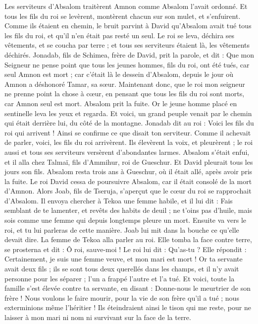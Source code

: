 \begin{multicols}{2}
Les serviteurs d'Absalom traitèrent Amnon comme Absalom l’avait ordonné. Et tous les fils du roi se levèrent, montèrent chacun sur son mulet, et s'enfuirent.
Comme ils étaient en chemin, le bruit parvint à David qu'Absalom avait tué tous les fils du roi, et qu'il n'en était pas resté un seul.
Le roi se leva, déchira ses vêtements, et se coucha par terre ; et tous ses serviteurs étaient là, les vêtements déchirés.
Jonadab, fils de Schimea, frère de David, prit la parole, et dit : Que mon Seigneur ne pense point que tous les jeunes hommes, fils du roi, ont été tués, car seul Amnon est mort ; car c’était là le dessein d’Absalom, depuis le jour où Amnon a déshonoré Tamar, sa sœur.
Maintenant donc, que le roi mon seigneur ne prenne point la chose à cœur, en pensant que tous les fils du roi sont morts, car Amnon seul est mort.
Absalom prit la fuite. Or le jeune homme placé en sentinelle leva les yeux et regarda. Et voici, un grand peuple venait par le chemin qui était derrière lui, du côté de la montagne.
Jonadab dit au roi : Voici les fils du roi qui arrivent ! Ainsi se confirme ce que disait ton serviteur.
Comme il achevait de parler, voici, les fils du roi arrivèrent. Ils élevèrent la voix, et pleurèrent ; le roi aussi et tous ses serviteurs versèrent d’abondantes larmes.
Absalom s’était enfui, et il alla chez Talmaï, fils d’Ammihur, roi de Gueschur. Et David pleurait tous les jours son fils.
Absalom resta trois ans à Gueschur, où il était allé, après avoir pris la fuite.
Le roi David cessa de poursuivre Absalom, car il était consolé de la mort d'Amnon.
\VerseOne{}Alors Joab, fils de Tseruja, s’aperçut que le cœur du roi se rapprochait d’Absalom.
Il envoya chercher à Tekoa une femme habile, et il lui dit : Fais semblant de te lamenter, et revêts des habits de deuil ; ne t'oins pas d'huile, mais sois comme une femme qui depuis longtemps pleure un mort.
Ensuite va vers le roi, et tu lui parleras de cette manière. Joab lui mit dans la bouche ce qu'elle devait dire.
La femme de Tekoa alla parler au roi. Elle tomba la face contre terre, se prosterna et dit : Ô roi, sauve-moi !
Le roi lui dit : Qu'as-tu ? Elle répondit : Certainement, je suis une femme veuve, et mon mari est mort !
Or ta servante avait deux fils ; ils se sont tous deux querellés dans les champs, et il n'y avait personne pour les séparer ; l'un a frappé l'autre et l'a tué.
Et voici, toute la famille s'est élevée contre ta servante, en disant : Donne-nous le meurtrier de son frère ! Nous voulons le faire mourir, pour la vie de son frère qu'il a tué ; nous exterminions même l'héritier ! Ils éteindraient ainsi le tison qui me reste, pour ne laisser à mon mari ni nom ni survivant sur la face de la terre.

\end{multicols}
